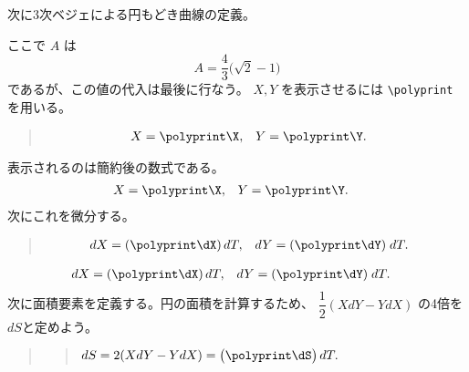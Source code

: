 \documentclass{jsarticle}
\begin{document}
\begin{quote}
\begin{boxedverbatim}
\end{boxedverbatim}
\end{quote}
次に3次ベジェによる円もどき曲線の定義。
\polydefine{}
\polydefine{}
\begin{quote}
\begin{boxedverbatim}
\polydefine{}
\polydefine{}
\end{boxedverbatim}
\end{quote}
ここで $A$ は
\[
  A=\dfrac43\bigl(\sqrt2-1\bigr)
\]
であるが、この値の代入は最後に行なう。
$X,Y$ を表示させるには \verb|\polyprint| を用いる。
\begin{quote}
\begin{boxedverbatim}
\begin{align*}
  X &= \polyprint\X, & Y &= \polyprint\Y.
\end{align*}    
\end{boxedverbatim}
\end{quote}
表示されるのは簡約後の数式である。
\begin{align*}
  X &= \polyprint\X, & Y &= \polyprint\Y.
\end{align*}
\newpage
次にこれを微分する。
\polydiff{}\X  \polydiff{}\Y
\begin{quote}
\begin{boxedverbatim}
\polydiff{}\X  \polydiff{}\Y
\begin{align*}
  dX &= (\polyprint\dX)\,dT, & dY &= (\polyprint\dY)\;dT.
\end{align*}    
\end{boxedverbatim}
\end{quote}
\begin{align*}
  dX &= (\polyprint\dX)\,dT, & dY &= (\polyprint\dY)\;dT.
\end{align*}    
次に面積要素を定義する。円の面積を計算するため、
$\dfrac12(XdY-YdX)$ の4倍を$dS$と定めよう。
\begin{quote}
\begin{boxedverbatim}
\polymul\dSA\X\dY  \polymul\dSB\Y\dX
\polysub\dS\dSA\dSB \polymul{}\dS
\begin{quote}
$dS=2(XdY-YdX)=\bigl(\polyprint\dS\bigr)\,dT.$
\end{quote}
\end{boxedverbatim}
\end{quote}
\end{document}
